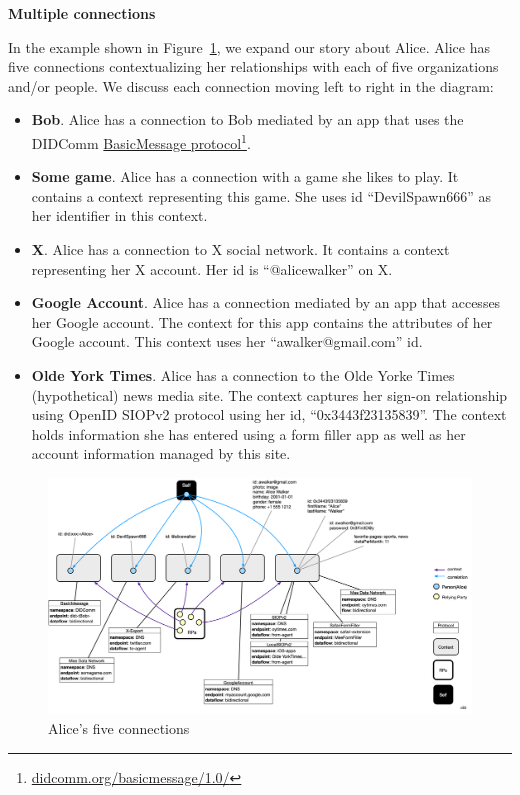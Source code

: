 \documentclass[11pt, oneside]{article}   	%
\newcommand{\hyperfootnote}[1][]{\def\ArgI{{#1}}\hyperfootnoteRelay}
\newcommand\hyperfootnoteRelay[2][]{\href{#1#2}{\ArgI}\footnote{\href{#1#2}{#2}}}
\begin{document}
\textbf{Multiple connections}

In the example shown in Figure~\ref{fig:groups}, we expand our story about Alice. Alice has five connections contextualizing her relationships with each of five organizations and/or people. We discuss each connection moving left to right in the diagram:

\begin{itemize}
	\item \textbf{Bob}. Alice has a connection to Bob mediated by an app that uses the DIDComm \hyperfootnote[BasicMessage protocol][https://]{didcomm.org/basicmessage/1.0/}.
	\item \textbf{Some game}. Alice has a connection with a game she likes to play. It contains a context representing this game. She uses id ``DevilSpawn666'' as her identifier in this context.  
	\item \textbf{X}. Alice has a connection to X social network. It contains a context representing her X account. Her id is ``@alicewalker'' on X.
	\item \textbf{Google Account}. Alice has a connection mediated by an app that accesses her Google account. The context for this app contains the attributes of her Google account. This context uses her ``awalker@gmail.com'' id. 
	\item \textbf{Olde York Times}. Alice has a connection to the Olde Yorke Times (hypothetical) news media site. The context captures her sign-on relationship using OpenID SIOPv2 protocol using her id, ``0x3443f23135839''. The context holds information she has entered using a form filler app as well as her account information managed by this site. 
\end{itemize}

\begin{figure}[htbp]
\includegraphics[width=\textwidth]{./images/multiple-connections.png}
\caption{Alice's five connections}
\label{fig:groups}
\end{figure}
\end{document}
